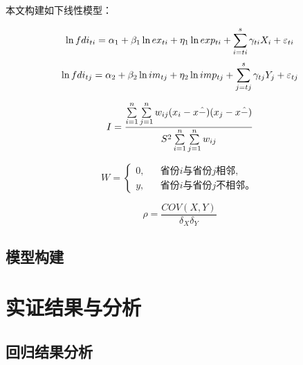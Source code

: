 \documentclass{article}
\begin{document}
{本文构建如下线性模型：
\begin{center}
	\begin{spacing}{0.8}%
	\begin{equation}
	\large 
\ln fdi_{ti}=\alpha_{1} +\beta_{1}\ln ex_{ti} +\eta_{ 1}\ln exp_{ti} +\sum_{i=ti}^{s}\gamma_{ti} X_{i} +\varepsilon_{ti} \label{eq1} 
    \end{equation}
    \begin{equation}
    \large
\ln fdi_{tj}=\alpha_{2} +\beta_{2}\ln im_{tj} +\eta_{2}\ln imp_{tj} +\sum_{j=tj}^{s}\gamma_{tj} Y_{j} +\varepsilon_{tj} \label{eq2} 
    \end{equation} 
    \end{spacing}
\end{center}

\begin{equation}
\large
I=\frac{\sum\limits_{i=1}^{n}\sum\limits_{j=1}^{n}w_{ij}(x_{i}-x\hat{-})(x_{j}-x\hat{-})}{S^{2}\sum\limits_{i=1}^{n}\sum\limits_{j=1}^{n}w_{ij}} \label{eq2} 
\end{equation}

\begin{equation}
W=\left\{
\begin{aligned}
0, &&\text{省份$i$与省份$j$相邻,} \\
y, &&\text{省份$i$与省份$j$不相邻。}
\end{aligned}
\right.
\end{equation}


\begin{center}
	\begin{spacing}{0.8}
	\begin{equation}
	\rho =\frac {COV(X,Y)} {\delta_{X} \delta_{Y}} \label{eq4} 
	\end{equation}
	\end{spacing}
\end{center}


\noindent  \subsection{模型构建}


\noindent  \section{实证结果与分析}

\noindent  \subsection{ 回归结果分析}
\vspace{0.1cm}%



}
\end{document}
